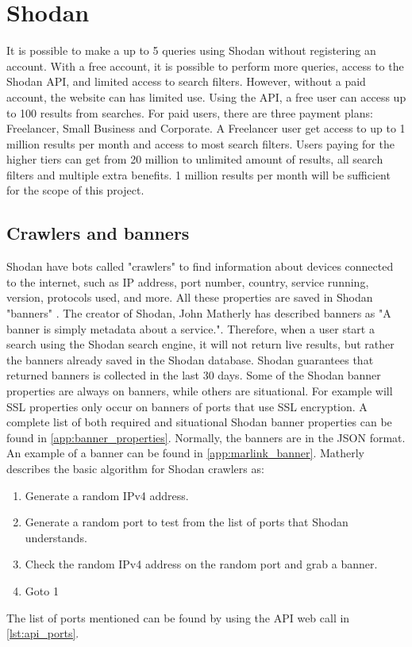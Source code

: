 \section{Shodan}\label{sec:shodan}
It is possible to make a up to 5 queries using Shodan without registering an account. 
With a free account, it is possible to perform more queries, access to the Shodan API, and limited access to search filters. However, without a paid account, the website can has limited use.
Using the API, a free user can access up to 100 results from searches. 
For paid users, there are three payment plans: Freelancer, Small Business and Corporate. A Freelancer user get access to up to 1 million results per month and access to most search filters. 
Users paying for the higher tiers can get from 20 million to unlimited amount of results, all search filters and multiple extra benefits. 
1 million results per month will be sufficient for the scope of this project.

\subsection{Crawlers and banners}
Shodan have bots called "crawlers" to find information about devices connected to the internet, such as IP address, port number, country, service running, version, protocols used, and more. 
All these properties are saved in Shodan "banners" . The creator of Shodan, John Matherly has described banners as "A banner is simply metadata about a service.". \cite{banner} 
Therefore, when a user start a search using the Shodan search engine, it will not return live results, but rather the banners already saved in the Shodan database. Shodan guarantees that returned banners is collected in the last 30 days.\cite{matherly_guide_to_shodan}
Some of the Shodan banner properties are always on banners, while others are situational. For example will SSL properties only occur on banners of ports that use SSL encryption. A complete list of both required and situational Shodan banner properties can be found in \cref{app:banner_properties}.
Normally, the banners are in the JSON format. An example of a banner can be found in \cref{app:marlink_banner}.
Matherly\cite{matherly_guide_to_shodan} describes the basic algorithm for Shodan crawlers as:
\begin{enumerate}
\setlength\itemsep{0em}
	\item Generate a random IPv4 address. 
	\item Generate a random port to test from the list of ports that Shodan understands.
	\item Check the random IPv4 address on the random port and grab a banner.
	\item Goto 1
\end{enumerate}
The list of ports mentioned can be found by using the API web call in \cref{lst:api_ports}.


